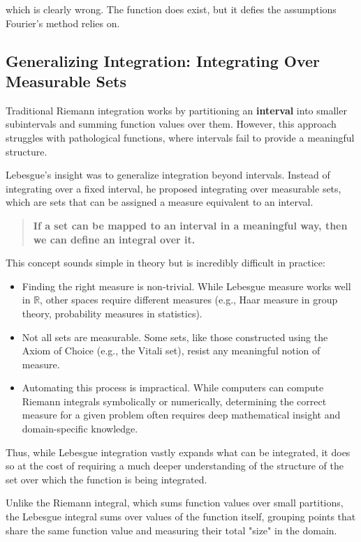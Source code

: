 \documentclass{article}
\begin{document}
which is clearly wrong. The function does exist, but it defies the assumptions Fourier’s method relies on.

\subsection{Generalizing Integration: Integrating Over Measurable Sets}

Traditional Riemann integration works by partitioning an \textbf{interval} into smaller subintervals and summing function values over them. However, this approach struggles with pathological functions, where intervals fail to provide a meaningful structure.

Lebesgue's insight was to generalize integration beyond intervals. Instead of integrating over a fixed interval, he proposed integrating over measurable sets, which are sets that can be assigned a measure equivalent to an interval.

\begin{quote}
\textbf{If a set can be mapped to an interval in a meaningful way, then we can define an integral over it.}
\end{quote}

This concept sounds simple in theory but is incredibly difficult in practice:

\begin{itemize}
    \item Finding the right measure is non-trivial. While Lebesgue measure works well in \(\mathbb{R}\), other spaces require different measures (e.g., Haar measure in group theory, probability measures in statistics).
    \item Not all sets are measurable. Some sets, like those constructed using the Axiom of Choice (e.g., the Vitali set), resist any meaningful notion of measure.
    \item Automating this process is impractical. While computers can compute Riemann integrals symbolically or numerically, determining the correct measure for a given problem often requires deep mathematical insight and domain-specific knowledge.
\end{itemize}

Thus, while Lebesgue integration vastly expands what can be integrated, it does so at the cost of requiring a much deeper understanding of the structure of the set over which the function is being integrated.

Unlike the Riemann integral, which sums function values over small partitions, the Lebesgue integral sums over values of the function itself, grouping points that share the same function value and measuring their total "size" in the domain. 
\end{document}

